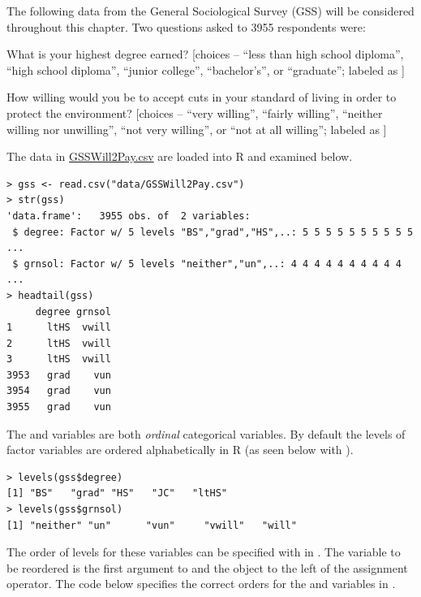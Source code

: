 \documentclass[10pt,openany]{book}\usepackage[]{graphicx}\usepackage[]{color}
\makeatletter
\newenvironment{kframe}{%
 \def\at@end@of@kframe{}%
 \ifinner\ifhmode%
  \def\at@end@of@kframe{\end{minipage}}%
  \begin{minipage}{\columnwidth}%
 \fi\fi%
 \def\FrameCommand##1{\hskip\@totalleftmargin \hskip-\fboxsep
 \colorbox{shadecolor}{##1}\hskip-\fboxsep
     \hskip-\linewidth \hskip-\@totalleftmargin \hskip\columnwidth}%
 \MakeFramed {\advance\hsize-\width
   \@totalleftmargin\z@ \linewidth\hsize
   \@setminipage}}%
 {\par\unskip\endMakeFramed%
 \at@end@of@kframe}
\newenvironment{knitrout}{}{} %
\makeatother
\begin{document}
\newpage
The following data from the General Sociological Survey (GSS) will be considered throughout this chapter.  Two questions asked to 3955 respondents were:
\vspace{-12pt}
\begin{Itemize}
  \item What is your highest degree earned? [choices -- ``less than high school diploma'', ``high school diploma'', ``junior college'', ``bachelor's'', or ``graduate''; labeled as ]
  \item How willing would you be to accept cuts in your standard of living in order to protect the environment? [choices -- ``very willing'', ``fairly willing'', ``neither willing nor unwilling'', ``not very willing'', or ``not at all willing''; labeled as ]
\end{Itemize}
The data in \href{https://raw.githubusercontent.com/droglenc/NCData/master/GSSWill2Pay.csv}{GSSWill2Pay.csv} are loaded into R and examined below.
\begin{knitrout}
\color{fgcolor}\begin{kframe}
\begin{verbatim}
> gss <- read.csv("data/GSSWill2Pay.csv")
> str(gss)
'data.frame':	3955 obs. of  2 variables:
 $ degree: Factor w/ 5 levels "BS","grad","HS",..: 5 5 5 5 5 5 5 5 5 5 ...
 $ grnsol: Factor w/ 5 levels "neither","un",..: 4 4 4 4 4 4 4 4 4 4 ...
> headtail(gss)
     degree grnsol
1      ltHS  vwill
2      ltHS  vwill
3      ltHS  vwill
3953   grad    vun
3954   grad    vun
3955   grad    vun
\end{verbatim}
\end{kframe}
\end{knitrout}
The  and  variables are both \emph{ordinal} categorical variables.  By default the levels of factor variables are ordered alphabetically in R (as seen below with ).
\begin{knitrout}
\color{fgcolor}\begin{kframe}
\begin{verbatim}
> levels(gss$degree)
[1] "BS"   "grad" "HS"   "JC"   "ltHS"
> levels(gss$grnsol)
[1] "neither" "un"      "vun"     "vwill"   "will"   
\end{verbatim}
\end{kframe}
\end{knitrout}
The order of levels for these variables can be specified with  in . The variable to be reordered is the first argument to  and the object to the left of the assignment operator. The code below specifies the correct orders for the  and  variables in .
\end{document}

